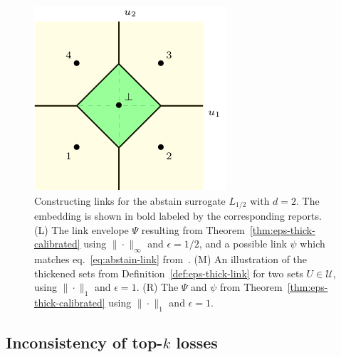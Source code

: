 \documentclass[12pt]{article}
\newcommand{\Comments}{1}
\newcommand{\mytodo}[2]{\ifnum\Comments=1%
  \todo[linecolor=#1!80!black,backgroundcolor=#1,bordercolor=#1!80!black]{#2}\fi}
\newcommand{\btw}[1]{}%
\newcommand{\U}{\mathcal{U}}
\newcommand{\elltopk}{\ell_{\text{top-$k$}}}
\begin{document}
\begin{figure}
\begin{center}
\begin{minipage}{0.32\linewidth}
\end{minipage}\hfill
\begin{minipage}{0.32\linewidth}
\includegraphics[width=\linewidth]{./tikz/abstain-link-l1.pdf}
\end{minipage}\hfill
\caption{Constructing links for the abstain surrogate $L_{1/2}$ with $d=2$. The embedding is shown in bold labeled by the corresponding reports. (L) The link envelope $\Psi$ resulting from Theorem~\ref{thm:eps-thick-calibrated} using $\|\cdot\|_\infty$ and $\epsilon = 1/2$, and a possible link $\psi$ which matches eq.~\eqref{eq:abstain-link} from~\cite{ramaswamy2018consistent}.  (M) An illustration of the thickened sets from Definition~\ref{def:eps-thick-link} for two sets $U \in \U$, using $\|\cdot\|_1$ and $\epsilon = 1$. (R) The $\Psi$ and $\psi$ from Theorem~\ref{thm:eps-thick-calibrated} using $\|\cdot\|_1$ and $\epsilon = 1$.}
\label{fig:abstain-links}
\end{center}
\end{figure}

\subsection{Inconsistency of top-$k$ losses}

\btw{The story we discussed: YK show $L'$ is inconsistent.  Our framework lets us ask: with what discrete loss \emph{is} $L'$ consistent?  (It also assures us that $L'$ is consistent for something...) Oh look, $L'$ embeds something which is $\elltopk$ plus some other term, so (a) we can see very clearly what $L'$ ``is doing'', and (b) we can see where to look for distributions yielding inconsistency, namely ones for which we actually prefer to report a set with $|r|<k$.}
\end{document}
